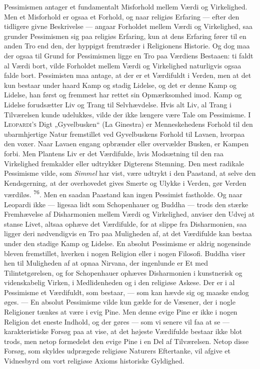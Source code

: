 \documentclass[12pt,a4paper,openany]{book}
\newcommand{\opage}[1]{\marginnote{\footnotesize\textit{[#1]}}}
\begin{document}
Pessimismen antager et fundamentalt Misforhold mellem Værdi og
Virkelighed. Men et Misforhold er ogsaa et Forhold, og naar religiøs
Erfaring --- efter den tidligere givne Beskrivelse --- angaar Forholdet
mellem Værdi og Virkelighed, saa grunder Pessimismen sig paa religiøs
Erfaring, kun at dens Erfaring fører til en anden Tro end den, der
hyppigst fremtræder i Religionens Historie. Og dog maa der ogsaa til
Grund for Pessimismen ligge en Tro paa Værdiens Bestaaen: ti faldt al
Værdi bort, vilde Forholdet mellem Værdi og Virkelighed naturligvis
ogsaa falde bort. Pessimisten maa antage, at der er et Værdifuldt i
Verden, men at det kun bestaar under haard Kamp og stadig Lidelse, og
det er denne Kamp og Lidelse, han først og fremmest har rettet sin
Opmærksomhed imod. Kamp og Lidelse forudsætter Liv og Trang til
Selvhævdelse. Hvis alt Liv, al Trang i Tilværelsen kunde udelukkes,
vilde der ikke længere være Tale om Pessimisme. I \textsc{Leopardi’s}
Digt „Gyvelbusken“ (La Ginestra) er Menneskehedens Forhold til den
ubarmhjertige Natur fremstillet ved Gyvelbuskens Forhold til Lavaen,
hvorpaa den voxer. Naar Lavaen engang opbrænder eller overvælder Busken,
er Kampen forbi. Men Plantens Liv er det Værdifulde, hvis Modsætning til
den raa Virkelighed fremkalder eller udtrykker Digterens Stemning. Den
mest radikale Pessimisme vilde, som \textit{Simmel} har vist,
\opage{153}være udtrykt i den Paastand, at selve den Kendsgerning, at
der overhovedet gives Smerte og Ulykke i Verden, gør Verden værdiløs.
\textsuperscript{76}. Men en saadan Paastand kan ingen Pessimist
fastholde. Og naar Leopardi ikke --- ligesaa lidt som Schopenhauer og
Buddha --- trods den stærke Fremhævelse af Disharmonien mellem Værdi og
Virkelighed, anviser den Udvej at stanse Livet, altsaa ophæve det
Værdifulde, for at slippe fra Disharmonien, saa ligger deri nødvendigvis
en Tro paa Muligheden af, at det Værdifulde kan bestaa under den stadige
Kamp og Lidelse. En absolut Pessimisme er aldrig nogensinde bleven
fremstillet, hverken i nogen Religion eller i nogen Filosofi. Buddha
viser hen til Muligheden af at opnaa Nirvana, der ingenlunde er Et med
Tilintetgørelsen, og for Schopenhauer ophæves Disharmonien i kunstnerisk
og videnskabelig Virken, i Medlidenheden og i den religiøse Askese. Der
er i al Pessimisme et Værdifuldt, som bestaar, --- som kan hævde sig og
maaske endog øges. --- En absolut Pessimisme vilde kun gælde for de
Væsener, der i nogle Religioner tænkes at være i evig Pine. Men denne
evige Pine er ikke i nogen Religion det eneste Indhold, og der gøres ---
som vi senere vil faa at se --- karakteristiske Forsøg paa at vise, at
det højeste Værdifulde bestaar ikke blot trods, men netop formedelst den
evige Pine i en Del af Tilværelsen. Netop disse Forsøg, som skyldes
udprægede religiøse Naturers Eftertanke, vil afgive et Vidnesbyrd om
vort religiøse Axioms historiske Gyldighed.
\end{document}
